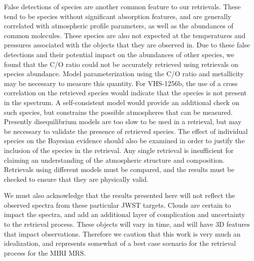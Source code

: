 False detections of species are another common feature to our retrievals.
These tend to be species without significant absorption features, and are generally correlated with atmospheric profile parameters, as well as the abundances of common molecules.
These species are also not expected at the temperatures and pressures associated with the objects that they are observed in.
Due to these false detections and their potential impact on the abundances of other species, we found that the C/O ratio could not be accurately retrieved using retrievals on species abundance.
Model parameterization using the C/O ratio and metallicity may be necessary to measure this quantity.
For VHS-1256b, the use of a cross correlation on the retrieved species would indicate that the species is not present in the spectrum.
A self-consistent model would provide an additional check on such species, but constrains the possible atmospheres that can be measured.
Presently disequilibrium models are too slow to be used in a retrieval, but may be necessary to validate the presence of retrieved species.
The effect of individual species on the Bayesian evidence should also be examined in order to justify the inclusion of the species in the retrieval.
Any single retrieval is insufficient for claiming an understanding of the atmospheric structure and composition.
Retrievals using different models must be compared, and the results must be checked to ensure that they are physically valid.

We must also acknowledge that the results presented here will not reflect the observed spectra from these particular JWST targets.
Clouds are certain to impact the spectra, and add an additional layer of complication and uncertainty to the retrieval process.
These objects will vary in time, and will have 3D features that impact observations.
Therefore we caution that this work is very much an idealization, and represents somewhat of a best case scenario for the retrieval process for the MIRI MRS.
 
